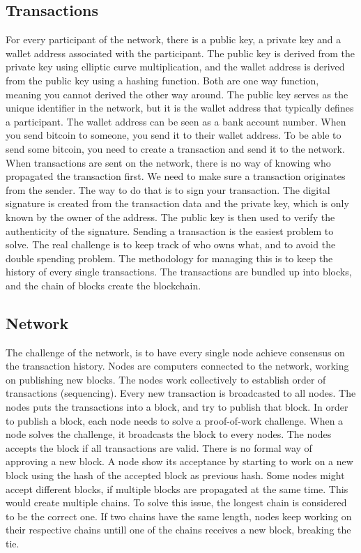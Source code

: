 \subsection{Transactions}
For every participant of the network, there is a public key, a private key and a wallet address associated with the participant.
The public key is derived from the private key using elliptic curve multiplication, and the wallet address is derived from the public key using a hashing function.
Both are one way function, meaning you cannot derived the other way around.
The public key serves as the unique identifier in the network, but it is the wallet address that typically defines a participant.
The wallet address can be seen as a bank account number. When you send bitcoin to someone, you send it to their wallet address.
To be able to send some bitcoin, you need to create a transaction and send it to the network. 
When transactions are sent on the network, there is no way of knowing who propagated the transaction first.
We need to make sure a transaction originates from the sender. The way to do that is to sign your transaction. The digital signature is created from the transaction data and the private key, which is only known by the owner of the address.
The public key is then used to verify the authenticity of the signature.
Sending a transaction is the easiest problem to solve. The real challenge is to keep track of who owns what, and to avoid the double spending problem.
The methodology for managing this is to keep the history of every single transactions. The transactions are bundled up into blocks, and the chain of blocks create the blockchain.


\subsection{Network}
The challenge of the network, is to have every single node achieve consensus on the transaction history. Nodes are computers connected to the network,
working on publishing new blocks. The nodes work collectively to establish order of transactions (sequencing). Every new transaction is broadcasted to all nodes.
The nodes puts the transactions into a block, and try to publish that block. In order to publish a block, each node needs to solve a proof-of-work challenge.
When a node solves the challenge, it broadcasts the block to every nodes. The nodes accepts the block if all transactions are valid. There is no formal
way of approving a new block. A node show its acceptance by starting to work on a new block using the hash of the accepted block as previous hash.
Some nodes might accept different blocks, if multiple blocks are propagated at the same time. This would create multiple chains. To solve this issue, the longest chain is considered to be the correct one. 
If two chains have the same length, nodes keep working on their respective chains untill one of the chains receives a new block, breaking the tie.


